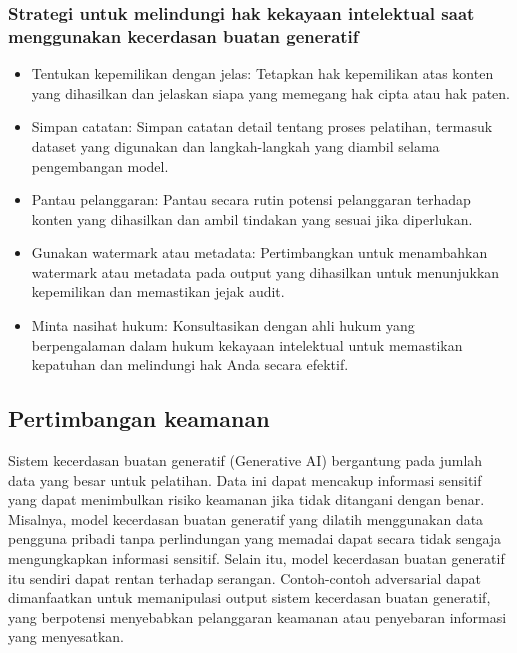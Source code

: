 \documentclass{article}
\begin{document}
\subsubsection{Strategi untuk melindungi hak kekayaan intelektual saat menggunakan kecerdasan buatan generatif}
\begin{itemize}
    \item Tentukan kepemilikan dengan jelas: Tetapkan hak kepemilikan atas konten yang dihasilkan dan jelaskan siapa yang memegang hak cipta atau hak paten.
    \item Simpan catatan: Simpan catatan detail tentang proses pelatihan, termasuk dataset yang digunakan dan langkah-langkah yang diambil selama pengembangan model.
    \item Pantau pelanggaran: Pantau secara rutin potensi pelanggaran terhadap konten yang dihasilkan dan ambil tindakan yang sesuai jika diperlukan.
    \item Gunakan watermark atau metadata: Pertimbangkan untuk menambahkan watermark atau metadata pada output yang dihasilkan untuk menunjukkan kepemilikan dan memastikan jejak audit.
    \item Minta nasihat hukum: Konsultasikan dengan ahli hukum yang berpengalaman dalam hukum kekayaan intelektual untuk memastikan kepatuhan dan melindungi hak Anda secara efektif.
\end{itemize}

\subsection{Pertimbangan keamanan}
Sistem kecerdasan buatan generatif (Generative AI) bergantung pada jumlah data yang besar untuk pelatihan. Data ini dapat mencakup informasi sensitif yang dapat menimbulkan risiko keamanan jika tidak ditangani dengan benar. Misalnya, model kecerdasan buatan generatif yang dilatih menggunakan data pengguna pribadi tanpa perlindungan yang memadai dapat secara tidak sengaja mengungkapkan informasi sensitif. Selain itu, model kecerdasan buatan generatif itu sendiri dapat rentan terhadap serangan. Contoh-contoh adversarial dapat dimanfaatkan untuk memanipulasi output sistem kecerdasan buatan generatif, yang berpotensi menyebabkan pelanggaran keamanan atau penyebaran informasi yang menyesatkan.
\end{document}
